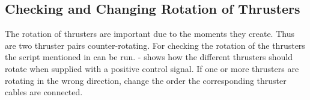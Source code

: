 \subsection{Checking and Changing Rotation of Thrusters}
The rotation of thrusters are important due to the moments they create. Thus are two thruster pairs counter-rotating. For checking the rotation of the thrusters the script mentioned in  can be run.  -  shows how the different thrusters should rotate when supplied with a positive control signal. If one or more thrusters are rotating in the wrong direction, change the order the corresponding thruster cables are connected. 
%		
%        
%        

